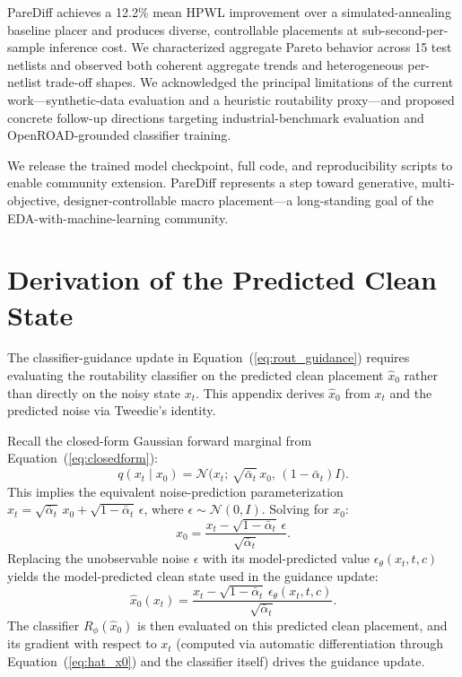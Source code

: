 \documentclass[lettersize,journal]{IEEEtran}
\begin{document}
PareDiff achieves a 12.2\% mean HPWL improvement over a simulated-annealing baseline placer and produces diverse, controllable placements at sub-second-per-sample inference cost. We characterized aggregate Pareto behavior across 15 test netlists and observed both coherent aggregate trends and heterogeneous per-netlist trade-off shapes. We acknowledged the principal limitations of the current work---synthetic-data evaluation and a heuristic routability proxy---and proposed concrete follow-up directions targeting industrial-benchmark evaluation and OpenROAD-grounded classifier training.

We release the trained model checkpoint, full code, and reproducibility scripts to enable community extension. PareDiff represents a step toward generative, multi-objective, designer-controllable macro placement---a long-standing goal of the EDA-with-machine-learning community.

\appendices
\section{Derivation of the Predicted Clean State}

The classifier-guidance update in Equation~(\ref{eq:rout_guidance}) requires evaluating the routability classifier on the predicted clean placement $\hat{x}_0$ rather than directly on the noisy state $x_t$. This appendix derives $\hat{x}_0$ from $x_t$ and the predicted noise via Tweedie's identity.

Recall the closed-form Gaussian forward marginal from Equation~(\ref{eq:closedform}):
\begin{equation*}
q(x_t \mid x_0) = \mathcal{N}\!\big(x_t;\, \sqrt{\bar{\alpha}_t}\, x_0,\, (1 - \bar{\alpha}_t) I\big).
\end{equation*}
This implies the equivalent noise-prediction parameterization $x_t = \sqrt{\bar{\alpha}_t}\, x_0 + \sqrt{1 - \bar{\alpha}_t}\, \epsilon$, where $\epsilon \sim \mathcal{N}(0, I)$. Solving for $x_0$:
\begin{equation}
\label{eq:tweedie}
x_0 = \frac{x_t - \sqrt{1 - \bar{\alpha}_t}\, \epsilon}{\sqrt{\bar{\alpha}_t}}.
\end{equation}
Replacing the unobservable noise $\epsilon$ with its model-predicted value $\epsilon_\theta(x_t, t, c)$ yields the model-predicted clean state used in the guidance update:
\begin{equation}
\label{eq:hat_x0}
\hat{x}_0(x_t) = \frac{x_t - \sqrt{1 - \bar{\alpha}_t}\, \epsilon_\theta(x_t, t, c)}{\sqrt{\bar{\alpha}_t}}.
\end{equation}
The classifier $R_\phi(\hat{x}_0)$ is then evaluated on this predicted clean placement, and its gradient with respect to $x_t$ (computed via automatic differentiation through Equation~(\ref{eq:hat_x0}) and the classifier itself) drives the guidance update.
\end{document}
